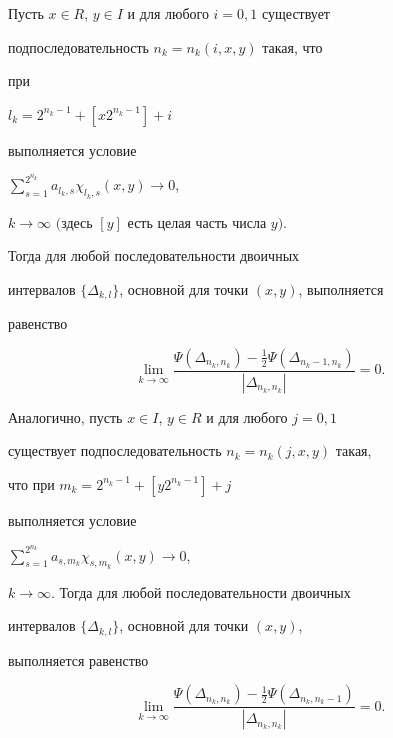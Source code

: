 \begin{assrt}\label{5}


Пусть $x \in R$, $y \in I$ и для любого $i=0,1$ существует 


подпоследовательность $n_k=n_{k}(i,x,y)$ такая, что 


при 


$l_k=2^{n_k-1}+[x2^{n_k-1}]+i$ 


выполняется условие 


$\sum\limits_{s=1}^{2^{n_k}}a_{l_k,s}


\chi_{l_k,s}(x,y) \to 0$, 


$k \to \infty$ $($здесь $[y]$ есть целая часть числа $y)$.


Тогда для любой последовательности двоичных 


интервалов $\{\Delta_{k,l}\}$, основной для точки $(x,y)$, выполняется 


равенство


\begin{equation}


\lim\limits_{k \to \infty}\frac


{\Psi(\Delta_{n_k,n_k})-\frac{1}{2}\Psi(\Delta_{n_k-1,n_k})}


{|\Delta_{n_k,n_k}|}=0.


\end{equation}





Аналогично, пусть $x \in I$, $y \in R$ и для любого $j=0,1$ 


существует подпоследовательность $n_k{=}n_{k}(j,x,y)$ такая, 


что при $m_k{=}2^{n_k-1}+[y2^{n_k-1}]+j$ 


выполняется условие 


$\sum\limits_{s=1}^{2^{n_k}}a_{s,m_{k}}


\chi_{s,m_{k}}(x,y) {\to} 0$, 


$k \to \infty$. Тогда для любой последовательности двоичных 


интервалов $\{\Delta_{k,l}\}$, основной для точки $(x,y)$, 


выполняется равенство


\begin{equation}


\lim\limits_{k \to \infty}\frac


{\Psi(\Delta_{n_k,n_k})-\frac{1}{2}\Psi(\Delta_{n_k,n_k-1})}


{|\Delta_{n_k,n_k}|}=0.


\end{equation}


\end{assrt}





